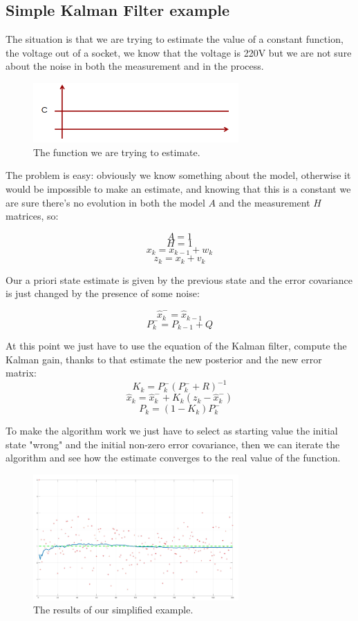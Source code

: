 \subsection{Simple Kalman Filter example}

The situation is that we are trying to estimate the value of a constant function, the voltage out of a socket, we know that the voltage is 220V but we are not sure about the noise in both the measurement and in the process.

\begin{figure}[H]
    \centering
    \includegraphics[width=0.7\textwidth]{Figures/constatn.png}
    \caption{The function we are trying to estimate.}
    \label{img:const}
\end{figure}

The problem is easy: obviously we know something about the model, otherwise it would be impossible to make an estimate, and knowing that this is a constant we are sure there's no evolution in both the model $A$ and the measurement $H$ matrices, so:

\[
  A = 1  
\]
\[
  H = 1  
\]
\[
  x_k= x_{k-1} + w_k
\]
\[
  z_k = x_k + v_k  
\]

Our a priori state estimate is given by the previous state and the error covariance is just changed by the presence of some noise:

\[
  \hat{x}^-_k = \hat{x}_{k-1}
\]
\[
    P^-_k = P_{k-1}+Q    
\]

At this point we just have to use the equation of the Kalman filter, compute the Kalman gain, thanks to that estimate the new posterior and the new error matrix:
\[
    K_k = P^-_k(P^-_k+R)^{-1}    
\]
\[
    \hat{x}_k = \hat{x}^-_k+K_k(z_k-\hat{x}^-_k)    
\]
\[
    P_k = (1-K_k)P^-_k    
\]

To make the algorithm work we just have to select as starting value the initial state "wrong" and the initial non-zero error covariance, then we can iterate the algorithm and see how the estimate converges to the real value of the function.

\begin{figure}[H]
    \centering
    \includegraphics[width=0.7\textwidth]{Figures/voltage.png}
    \caption{The results of our simplified example.}
    \label{img:voltage}
\end{figure}


